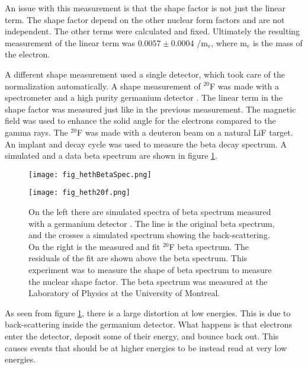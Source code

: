 \documentclass[../MaxHughesThesis.tex]{subfiles}
\begin{document}
An issue with this measurement is that the shape factor is not just the linear term.
The shape factor depend on the other nuclear form factors and are not independent.
The other terms were calculated and fixed.
Ultimately the resulting measurement of the linear term was $0.0057 \pm 0.0004 $ /m$_{e}$, where m$_{e}$ is the mass of the electron.

A different shape measurement used  a single detector, which took care of the normalization automatically. 
A shape measurement of $^{20}$F was made with a spectrometer and a high purity germanium detector \cite{Het89}.
The linear term in the shape factor was measured just like in the previous measurement.
The magnetic field was used to enhance the solid angle for the electrons compared to the gamma rays.
The $^{20}$F was made with a deuteron beam on a natural LiF target. 
An implant and decay cycle was used to measure the beta decay spectrum. 
A simulated and a data beta spectrum are shown in figure \ref{fig:hethspec}.

\begin{figure}[!htb]
	\begin{minipage}[b][][b]{0.50\textwidth}
		\centerline{\texttt{[image: fig\_hethBetaSpec.png]}}
	\end{minipage}\hfill
	\begin{minipage}[b][][b]{0.50\textwidth}
		\centerline{\texttt{[image: fig\_heth20f.png]}}
	\end{minipage}
	\caption{On the left there are simulated spectra of beta spectrum measured with a germanium detector \cite{Het89}.
		 The line is the original beta spectrum, and the crosses a simulated spectrum showing the back-scattering.
		 On the right is the measured and fit $^{20}$F beta spectrum.
		 The residuals of the fit are shown above the beta spectrum.
		 This experiment was to measure the shape of beta spectrum to measure the nuclear shape factor.
		 The beta spectrum was measured at the Laboratory of Physics at the University of Montreal. }
	\label{fig:hethspec}
\end{figure}

As seen from figure \ref{fig:hethspec}, there is a large distortion at low energies.
This is due to back-scattering inside the germanium detector.
What happens is that electrons enter the detector, deposit some of their energy, and bounce back out.
This causes events that should be at higher energies to be instead read at very low energies.
\end{document}
